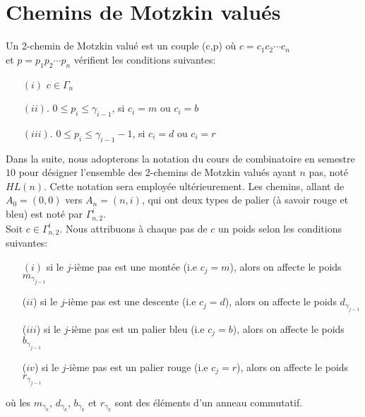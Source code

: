 \section{Chemins de Motzkin valués}
\begin{definition}
	\begin{rm}
		Un 2-chemin de Motzkin valué est un couple (c,p) où $c = c_{1}c_{2}\cdots c_{n}$\\ et $p = p_{1}p_{2}\cdots p_{n}$
		vérifient les conditions suivantes:
		\begin{itemize}
			\item[$(i)$] $c \in \Gamma_{n}$
			\item[$(ii)$.] $0\leq p_{i}\leq \gamma_{i-1}$, si $c_{i}=m\text{ ou }c_{i}=b$
			\item[$(iii)$.]  $0\leq p_{i}\leq \gamma_{i-1} - 1$, si  $c_{i}=d\text{ ou }c_{i}=r$
		\end{itemize}
	\end{rm}
\end{definition}
Dans la suite, nous adopterons la notation du cours de combinatoire en semestre $10$ pour désigner l'ensemble des 2-chemins de Motzkin valués ayant $n$ pas, noté $HL(n)$. Cette notation sera employée ultérieurement. Les chemins, allant de $A_{0}=(0, 0)$ vers $A_{n}=(n, i)$, qui ont deux types de palier (à savoir rouge et bleu) est noté par $\Gamma_{n, 2}^{i}$. \\
Soit $c \in \Gamma_{n, 2}^{i}$. Nous attribuons à chaque pas de $c$ un poids selon les conditions suivantes:
\begin{itemize}
	\item [$(i)$] si le $j$-ième pas est une montée (i.e $c_{j}=m$), alors on affecte le poids $m_{\gamma_{j-1}}$
	\item [($ii$)] si le $j$-ième pas est une descente (i.e $c_{j}=d$), alors on affecte le poids $d_{\gamma_{j-1}}$
	\item [($iii$)]  si le $j$-ième pas est un palier bleu (i.e $c_{j}=b$), alors on affecte le poids $b_{\gamma_{j-1}}$
	\item [($iv$)]  si le $j$-ième pas est un palier rouge (i.e $c_{j}=r$), alors on affecte le poids $r_{\gamma_{j-1}}$
\end{itemize}
où les  $m_{\gamma_{k}}$, $d_{\gamma_{k}}$, $b_{\gamma_{k}}$ et  $r_{\gamma_{k}}$ sont des éléments d'un anneau commutatif.\vspace{10pt}\\
